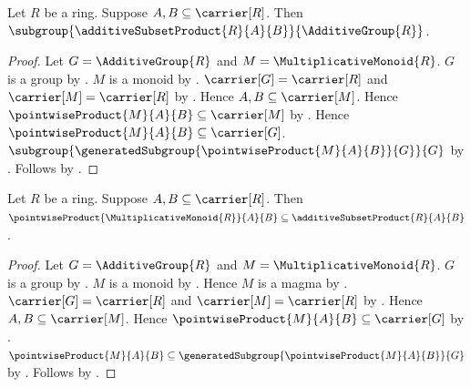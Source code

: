 \begin{theorem}\label{additive_subset_product_is_subgroup}
    Let $R$ be a ring.
    Suppose $A,B\subseteq\carrier[R]$.
    Then
        $\subgroup{\additiveSubsetProduct{R}{A}{B}}
            {\AdditiveGroup{R}}$.
\end{theorem}
\begin{proof}
    Let $G=\AdditiveGroup{R}$ and $M=\MultiplicativeMonoid{R}$.
    $G$ is a group by .
    $M$ is a monoid by .
    $\carrier[G]=\carrier[R]$ and $\carrier[M]=\carrier[R]$ by
        .
    Hence $A,B\subseteq\carrier[M]$.
    Hence $\pointwiseProduct{M}{A}{B}\subseteq\carrier[M]$ by
        .
    Hence $\pointwiseProduct{M}{A}{B}\subseteq\carrier[G]$.
    $\subgroup{\generatedSubgroup{
        \pointwiseProduct{M}{A}{B}}{G}}{G}$ by
        .
    Follows by .
\end{proof}

\begin{proposition}\label{pointwise_product_subseteq_additive_subset_product}
    Let $R$ be a ring.
    Suppose $A,B\subseteq\carrier[R]$.
    Then $\pointwiseProduct{\MultiplicativeMonoid{R}}{A}{B}
        \subseteq\additiveSubsetProduct{R}{A}{B}$.
\end{proposition}
\begin{proof}
    Let $G=\AdditiveGroup{R}$ and $M=\MultiplicativeMonoid{R}$.
    $G$ is a group by .
    $M$ is a monoid by .
    Hence $M$ is a magma by .
    $\carrier[G]=\carrier[R]$ and $\carrier[M]=\carrier[R]$ by
        .
    Hence $A,B\subseteq\carrier[M]$.
    Hence $\pointwiseProduct{M}{A}{B}\subseteq\carrier[G]$ by
        .
    $\pointwiseProduct{M}{A}{B}\subseteq
        \generatedSubgroup{\pointwiseProduct{M}{A}{B}}{G}$ by
        .
    Follows by .
\end{proof}

